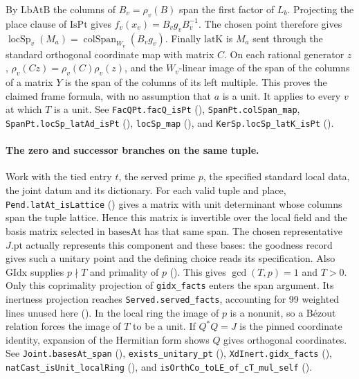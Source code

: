 By $\mathrm{LbAtB}$ the columns of $B_v=\rho_v(B)$ span the first
factor of $L_b$. Projecting the place clause of $\mathrm{IsPt}$ gives
$f_v(x_v)=B_vg_vB_v^{-1}$. The chosen point therefore gives
$\operatorname{locSp}_v(M_a)=\operatorname{colSpan}_{W_v}(B_v g_v)$.
Finally $\mathrm{latK}$ is $M_a$ sent through the standard orthogonal
coordinate map with matrix $C$. On each rational generator $z$,
$\rho_v(Cz)=\rho_v(C)\rho_v(z)$, and the $W_v$-linear image of the
span of the columns of a matrix $Y$ is the span of the columns of its
left multiple. This proves the claimed frame formula, with no assumption
that $a$ is a unit. It applies to every $v$ at which $T$ is a unit.
See \nolinkurl{FacQPt.facQ_isPt} (),
\nolinkurl{SpanPt.colSpan_map}, \nolinkurl{SpanPt.locSp_latAd_isPt}
(),
\nolinkurl{locSp_map} (),
and \nolinkurl{KerSp.locSp_latK_isPt}
().

\paragraph{The zero and successor branches on the same tuple.}
\label{r15:span-steps}
Work with the tied entry $t$, the served prime $p$, the specified
standard local data, the joint datum and its dictionary. For each valid
tuple and place, \nolinkurl{Pend.latAt_isLattice}
() gives a matrix with unit
determinant whose columns span the tuple lattice. Hence this matrix is invertible over the local
field and the basis matrix selected in $\mathrm{basesAt}$ has that same
span. The chosen representative $J.\mathrm{pt}$ actually represents this
component and these bases: the goodness record gives such a unitary
point and the defining choice reads its specification. Also
$\mathrm{GIdx}$ supplies $p\nmid T$ and primality of $p$
().
This gives $\gcd(T,p)=1$ and $T>0$. Only this coprimality projection
of \nolinkurl{gidx_facts} enters the span argument. Its inertness
projection reaches \nolinkurl{Served.served_facts}, accounting for 99
weighted lines unused here ().
In the local ring the image of $p$ is a nonunit, so a B\'ezout relation
forces the image of $T$ to be a unit. If $Q^*Q=J$ is the pinned
coordinate identity, expansion of the Hermitian form shows $Q$ gives
orthogonal coordinates. See \nolinkurl{Joint.basesAt_span}
(),
\nolinkurl{exists_unitary_pt} (),
\nolinkurl{XdInert.gidx_facts} (),
\nolinkurl{natCast_isUnit_localRing}
(),
and \nolinkurl{isOrthCo_toLE_of_cT_mul_self}
().

